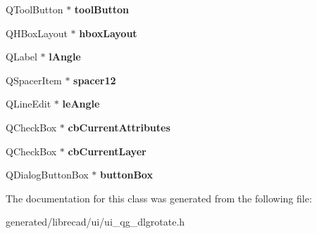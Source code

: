 \begin{DoxyCompactItemize}
\item 
\hypertarget{classUi__QG__DlgRotate_a10fc1a4b80bcab3dfddb724b2fd65def}{Q\-Tool\-Button $\ast$ {\bfseries tool\-Button}}\label{classUi__QG__DlgRotate_a10fc1a4b80bcab3dfddb724b2fd65def}

\item 
\hypertarget{classUi__QG__DlgRotate_a482abc673bfabc02a518d78a9d70a278}{Q\-H\-Box\-Layout $\ast$ {\bfseries hbox\-Layout}}\label{classUi__QG__DlgRotate_a482abc673bfabc02a518d78a9d70a278}

\item 
\hypertarget{classUi__QG__DlgRotate_a97403838b487a377c404f14db5efe167}{Q\-Label $\ast$ {\bfseries l\-Angle}}\label{classUi__QG__DlgRotate_a97403838b487a377c404f14db5efe167}

\item 
\hypertarget{classUi__QG__DlgRotate_a209d763a0c92d2de7a64c1d14b38b8b2}{Q\-Spacer\-Item $\ast$ {\bfseries spacer12}}\label{classUi__QG__DlgRotate_a209d763a0c92d2de7a64c1d14b38b8b2}

\item 
\hypertarget{classUi__QG__DlgRotate_a6e6eb88566f8c82c8290d19b58ea84ed}{Q\-Line\-Edit $\ast$ {\bfseries le\-Angle}}\label{classUi__QG__DlgRotate_a6e6eb88566f8c82c8290d19b58ea84ed}

\item 
\hypertarget{classUi__QG__DlgRotate_a7059528b06f7abe7b5965631f46518d3}{Q\-Check\-Box $\ast$ {\bfseries cb\-Current\-Attributes}}\label{classUi__QG__DlgRotate_a7059528b06f7abe7b5965631f46518d3}

\item 
\hypertarget{classUi__QG__DlgRotate_ac71d0411215873d473d66fbb0a4bebb3}{Q\-Check\-Box $\ast$ {\bfseries cb\-Current\-Layer}}\label{classUi__QG__DlgRotate_ac71d0411215873d473d66fbb0a4bebb3}

\item 
\hypertarget{classUi__QG__DlgRotate_af705787c89c9944f9ba28fd6cfadbf1b}{Q\-Dialog\-Button\-Box $\ast$ {\bfseries button\-Box}}\label{classUi__QG__DlgRotate_af705787c89c9944f9ba28fd6cfadbf1b}

\end{DoxyCompactItemize}


The documentation for this class was generated from the following file\-:\begin{DoxyCompactItemize}
\item 
generated/librecad/ui/ui\-\_\-qg\-\_\-dlgrotate.\-h\end{DoxyCompactItemize}
